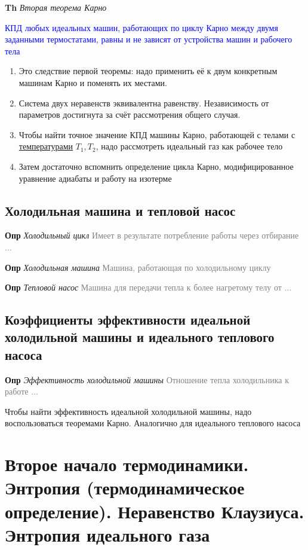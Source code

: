 \documentclass[a4paper, 14pt]{article}
\begin{document}
    \textbf{Th} \textit{Вторая теорема Карно}

    \textcolor{blue}{КПД любых идеальных машин, работающих по циклу Карно между двумя заданными термостатами, равны и
    не зависят от устройства машин и рабочего тела}

    \begin{enumerate}
        \item Это следствие первой теоремы: надо применить её к двум конкретным машинам Карно и поменять их местами.
        \item Система двух неравенств эквивалентна равенству.
        Независимость от параметров достигнута за счёт рассмотрения общего случая.
        \item Чтобы найти точное значение КПД машины Карно, работающей с телами с \underline{температурами} $T_1, T_2$,
        надо рассмотреть идеальный газ как рабочее тело
        \item Затем достаточно вспомнить определение цикла Карно, модифицированное уравнение адиабаты и работу на
        изотерме
    \end{enumerate}

    \subsection{Холодильная машина и тепловой насос}

    \textbf{Опр} \textit{Холодильный цикл} \textcolor{gray}{Имеет в результате потребление работы через отбирание ...}

    \textbf{Опр} \textit{Холодильная машина} \textcolor{gray}{Машина, работающая по холодильному циклу}

    \textbf{Опр} \textit{Тепловой насос} \textcolor{gray}{Машина для передачи тепла к более нагретому телу от ...}

    \subsection{Коэффициенты эффективности идеальной холодильной машины и идеального теплового насоса}

    \textbf{Опр} \textit{Эффективность холодильной машины} \textcolor{gray}{Отношение тепла холодильника к работе ...}

    Чтобы найти эффективность идеальной холодильной машины, надо воспользоваться теоремами Карно.
    Аналогично для идеального теплового насоса

    \section{Второе начало термодинамики.
    Энтропия (термодинамическое определение).
    Неравенство Клаузиуса.
    Энтропия идеального газа}
\end{document}
